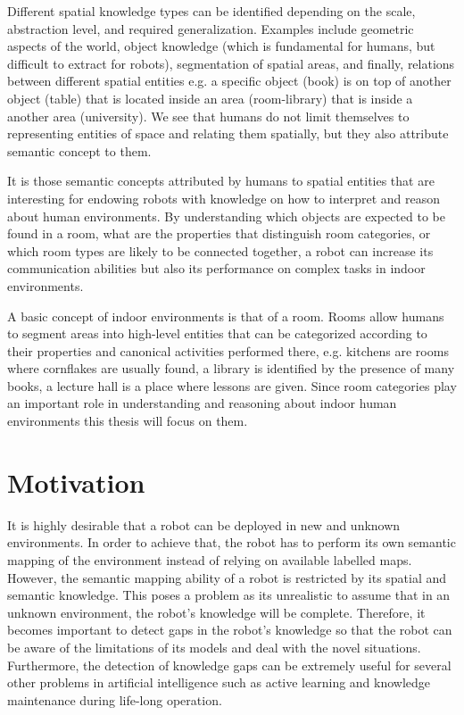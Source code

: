 Different spatial knowledge types can be identified depending on the scale, abstraction level,
and required generalization. Examples include geometric aspects of the world, object knowledge 
(which is fundamental for humans, but difficult to extract for robots), segmentation of
spatial areas, and finally, relations between different spatial entities e.g. a specific
object (book) is on top of another object (table) that is located inside an area (room-library)
that is inside a another area (university). We see that humans do not limit themselves to representing 
entities of space and relating them spatially, but they also attribute semantic concept to them.

It is those semantic concepts attributed by humans to spatial entities that are interesting for 
endowing robots with knowledge on how to interpret and reason about human environments.
By understanding which objects are expected to be found in a room, what are the properties that
distinguish room categories, or which room types are likely to be connected together, a robot can
increase its communication abilities but also its performance on complex tasks in indoor environments.

A basic concept of indoor environments is that of a room. Rooms allow humans to segment areas
into high\hyp{}level entities that can be categorized according to their properties and canonical
activities performed there, e.g. kitchens are rooms where cornflakes are usually found, a library is 
identified by the presence of many books, a lecture hall is a place where lessons are given.
Since room categories play an important role in understanding and reasoning about
indoor human environments this thesis will focus on them.


\section{Motivation}
It is highly desirable that a robot can be deployed in new and unknown environments. In order to achieve that,
the robot has to perform its own semantic mapping of the environment instead of relying on available labelled maps.
However, the semantic mapping ability of a robot is restricted by its spatial and semantic knowledge.
This poses a problem as its unrealistic to assume that in an unknown environment, the robot's knowledge
will be complete. Therefore, it becomes important to detect gaps in the robot's knowledge so that the robot can
be aware of the limitations of its models and deal with the novel situations. Furthermore, the detection of 
knowledge gaps can be extremely useful for several other problems in artificial intelligence such as 
active learning and knowledge maintenance during life-long operation.

